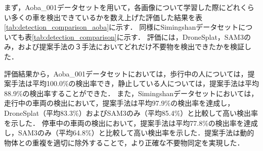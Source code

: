 \documentclass[a4paper,dvipdfmx,ja=standard,9pt]{bxjsarticle}
\begin{document}
\clearpage

まず，Aoba\_001データセットを用いて，各画像について学習した際にどれくらい多くの車を検出できているかを数え上げた評価した結果を表\ref{tab:detection_comparison_aoba}に示す．
同様にSimingshanデータセットについても表\ref{tab:detection_comparison}に示す．
評価には，DroneSplat，SAM3のみ，および提案手法の３手法においてどれだけ不要物を検出できたかを検証した．

評価結果から，Aoba\_001データセットにおいては，歩行中の人については，提案手法は平均100.0\%の検出率でき，静止している人については，提案手法は平均88.9\%の検出率することができた．
また，Simingshanデータセットにおいては，走行中の車両の検出において，提案手法は平均97.9\%の検出率を達成し，DroneSplat（平均83.3\%）およびSAM3のみ（平均85.4\%）と比較して高い検出率を示した．
停車中の車両の検出において，提案手法は平均77.8\%の検出率を達成し，SAM3のみ（平均64.8\%）と比較して高い検出率を示した．提案手法は動的物体との重複を適切に除外することで，より正確な不要物同定を実現した．
\end{document}
